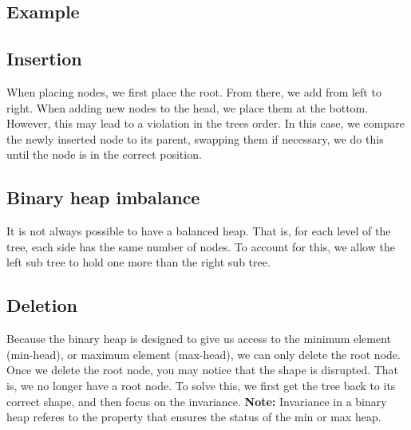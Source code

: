 \documentclass{report}
\begin{document}
    \subsection{Example}
    \begin{figure}[ht]
        \centering
        \label{fig:heap}
    \end{figure}
    \pagebreak 
    \subsection{Insertion}
    \bigbreak \noindent 
    When placing nodes, we first place the root. From there, we add from left to right.
    \bigbreak \noindent 
    When adding new nodes to the head, we place them at the bottom. However, this may lead to a violation in the trees order. In this case, we compare the newly inserted node to its parent, swapping them if necessary, we do this until the node is in the correct position.

    \bigbreak \noindent 
    \subsection{Binary heap imbalance}
    \bigbreak \noindent 
    It is not always possible to have a balanced heap. That is, for each level of the tree, each side has the same number of nodes. To account for this, we allow the left sub tree to hold one more than the right sub tree.
    \bigbreak \noindent 
    \subsection{Deletion}
    \bigbreak \noindent 
    Because the binary heap is designed to give us access to the minimum element (min-head), or maximum element (max-head), we can only delete the root node.
    \bigbreak \noindent 
    Once we delete the root node, you may notice that the shape is disrupted. That is, we no longer have a root node. To solve this, we first get the tree back to its correct shape, and then focus on the invariance.
    \bigbreak \noindent 
    \textbf{Note:} Invariance in a binary heap referes to the property that ensures the status of the min or max heap.
    \bigbreak \noindent 

    \bigbreak \noindent 
\end{document}
